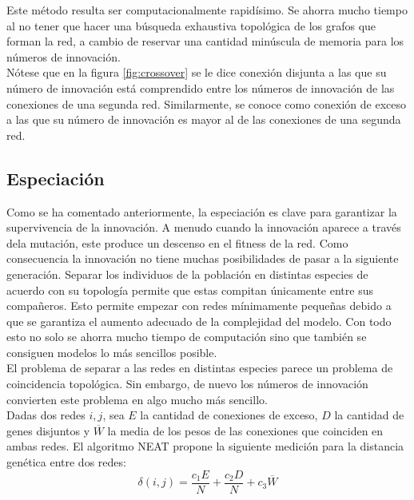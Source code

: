 \documentclass{article}
\begin{document}
Este método resulta ser computacionalmente rapidísimo. Se ahorra mucho tiempo al no tener que hacer una búsqueda exhaustiva topológica de los grafos que forman la red, a cambio de reservar una cantidad minúscula de memoria para los números de innovación.\\

Nótese que en la figura \ref{fig:crossover} se le dice conexión disjunta a las que su número de innovación está comprendido entre los números de innovación de las conexiones de una segunda red. Similarmente, se conoce como conexión de exceso a las que su número de innovación es mayor al de las conexiones de una segunda red.

\subsection{Especiación}
\label{especiacion}
Como se ha comentado anteriormente, la especiación es clave para garantizar la supervivencia de la innovación. A menudo cuando la innovación aparece a través dela mutación, este produce un descenso en el fitness de la red. Como consecuencia la innovación no tiene muchas posibilidades de pasar a la siguiente generación. Separar los individuos de la población en distintas especies de acuerdo con su topología permite que estas compitan únicamente entre sus compañeros. Esto permite empezar con redes mínimamente pequeñas debido a que se garantiza el aumento adecuado de la complejidad del modelo. Con todo esto no solo se ahorra mucho tiempo de computación sino que también se consiguen modelos lo más sencillos posible.\\

El problema de separar a las redes en distintas especies parece un problema de coincidencia topológica. Sin embargo, de nuevo los números de innovación convierten este problema en algo mucho más sencillo.\\

Dadas dos redes $i,j$, sea $E$ la cantidad de conexiones de exceso, $D$ la cantidad de genes disjuntos y $\overline{W}$ la media de los pesos de las conexiones que coinciden en ambas redes. El algoritmo NEAT propone la siguiente medición para la distancia genética entre dos redes:
$$\delta(i,j)=\frac{c_1E}{N}+\frac{c_2D}{N}+c_3\overline{W} $$
\end{document}
